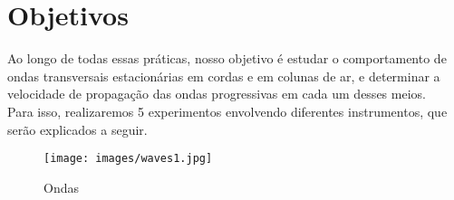 \newpage
\section{Objetivos}

Ao longo de todas essas práticas, nosso objetivo é estudar o comportamento de ondas transversais estacionárias em cordas e em colunas de ar, e determinar a velocidade de propagação das ondas progressivas em cada um desses meios.\\

Para isso, realizaremos 5 experimentos envolvendo diferentes instrumentos, que serão explicados a seguir.\\

\begin{figure}[H]
  \centering
  \texttt{[image: images/waves1.jpg]}
  \caption{Ondas}
\end{figure}
